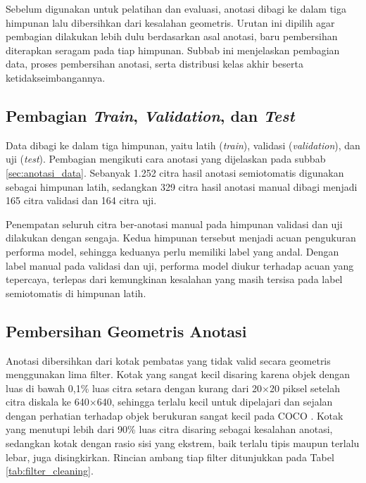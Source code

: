 Sebelum digunakan untuk pelatihan dan evaluasi, anotasi dibagi ke dalam tiga himpunan lalu 
dibersihkan dari kesalahan geometris. Urutan ini dipilih agar pembagian dilakukan lebih dulu 
berdasarkan asal anotasi, baru pembersihan diterapkan seragam pada tiap himpunan. Subbab ini 
menjelaskan pembagian data, proses pembersihan anotasi, serta distribusi kelas akhir beserta 
ketidakseimbangannya.

\subsection{Pembagian \textit{Train}, \textit{Validation}, dan \textit{Test}}

Data dibagi ke dalam tiga himpunan, yaitu latih (\textit{train}), validasi 
(\textit{validation}), dan uji (\textit{test}). Pembagian mengikuti cara anotasi yang 
dijelaskan pada subbab \ref{sec:anotasi_data}. Sebanyak 1.252 citra hasil anotasi 
semiotomatis digunakan sebagai himpunan latih, sedangkan 329 citra hasil anotasi manual 
dibagi menjadi 165 citra validasi dan 164 citra uji.

Penempatan seluruh citra ber-anotasi manual pada himpunan validasi dan uji dilakukan 
dengan sengaja. Kedua himpunan tersebut menjadi acuan pengukuran performa model, sehingga 
keduanya perlu memiliki label yang andal. Dengan label manual pada validasi dan uji, 
performa model diukur terhadap acuan yang tepercaya, terlepas dari kemungkinan kesalahan 
yang masih tersisa pada label semiotomatis di himpunan latih.

\subsection{Pembersihan Geometris Anotasi}

Anotasi dibersihkan dari kotak pembatas yang tidak valid secara geometris menggunakan 
lima filter. Kotak yang sangat kecil disaring karena objek dengan luas di bawah 0,1\% 
luas citra setara dengan kurang dari 20$\times$20 piksel setelah citra diskala ke 
640$\times$640, sehingga terlalu kecil untuk dipelajari dan sejalan dengan perhatian 
terhadap objek berukuran sangat kecil pada COCO \cite{lin2014coco}. Kotak yang menutupi 
lebih dari 90\% luas citra disaring sebagai kesalahan anotasi, sedangkan kotak dengan 
rasio sisi yang ekstrem, baik terlalu tipis maupun terlalu lebar, juga disingkirkan. 
Rincian ambang tiap filter ditunjukkan pada Tabel \ref{tab:filter_cleaning}.

